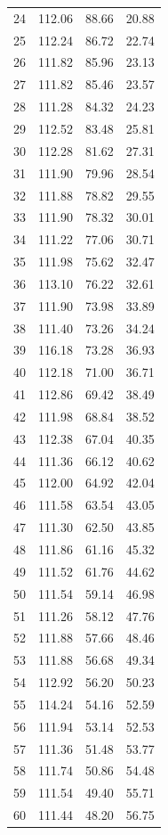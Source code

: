 \begin{longtable}{rrrr}
24 & 112.06 & 88.66 & 20.88 \\
25 & 112.24 & 86.72 & 22.74 \\
26 & 111.82 & 85.96 & 23.13 \\
27 & 111.82 & 85.46 & 23.57 \\
28 & 111.28 & 84.32 & 24.23 \\
29 & 112.52 & 83.48 & 25.81 \\
30 & 112.28 & 81.62 & 27.31 \\
31 & 111.90 & 79.96 & 28.54 \\
32 & 111.88 & 78.82 & 29.55 \\
33 & 111.90 & 78.32 & 30.01 \\
34 & 111.22 & 77.06 & 30.71 \\
35 & 111.98 & 75.62 & 32.47 \\
36 & 113.10 & 76.22 & 32.61 \\
37 & 111.90 & 73.98 & 33.89 \\
38 & 111.40 & 73.26 & 34.24 \\
39 & 116.18 & 73.28 & 36.93 \\
40 & 112.18 & 71.00 & 36.71 \\
41 & 112.86 & 69.42 & 38.49 \\
42 & 111.98 & 68.84 & 38.52 \\
43 & 112.38 & 67.04 & 40.35 \\
44 & 111.36 & 66.12 & 40.62 \\
45 & 112.00 & 64.92 & 42.04 \\
46 & 111.58 & 63.54 & 43.05 \\
47 & 111.30 & 62.50 & 43.85 \\
48 & 111.86 & 61.16 & 45.32 \\
49 & 111.52 & 61.76 & 44.62 \\
50 & 111.54 & 59.14 & 46.98 \\
51 & 111.26 & 58.12 & 47.76 \\
52 & 111.88 & 57.66 & 48.46 \\
53 & 111.88 & 56.68 & 49.34 \\
54 & 112.92 & 56.20 & 50.23 \\
55 & 114.24 & 54.16 & 52.59 \\
56 & 111.94 & 53.14 & 52.53 \\
57 & 111.36 & 51.48 & 53.77 \\
58 & 111.74 & 50.86 & 54.48 \\
59 & 111.54 & 49.40 & 55.71 \\
60 & 111.44 & 48.20 & 56.75 \\

\end{longtable}
